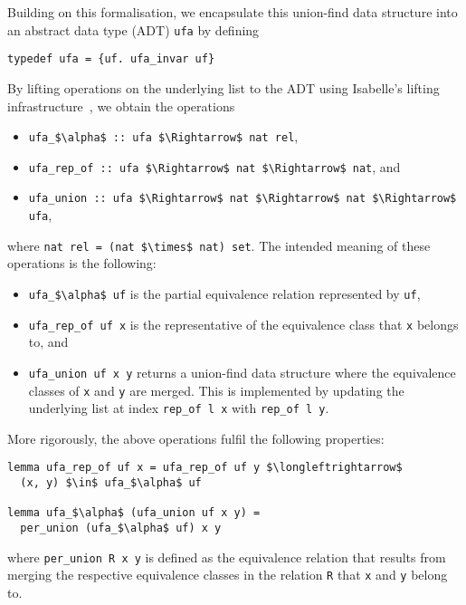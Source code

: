 \documentclass[
  sigplan,
  10pt,
  anonymous,
  review,
  ]{acmart}
\begin{document}
Building on this formalisation, we encapsulate this union-find data structure into an abstract data type (ADT) \lstinline|ufa| by defining
\begin{lstlisting}
typedef ufa = {uf. ufa_invar uf}
\end{lstlisting}
By lifting operations on the underlying list to the ADT using Isabelle's lifting infrastructure~\cite{lifting_transfer}, we obtain the operations
\begin{itemize}
  \item \lstinline!ufa_$\alpha$ :: ufa $\Rightarrow$ nat rel!,
  \item \lstinline!ufa_rep_of :: ufa $\Rightarrow$ nat $\Rightarrow$ nat!, and
  \item \lstinline!ufa_union :: ufa $\Rightarrow$ nat $\Rightarrow$ nat $\Rightarrow$ ufa!,
\end{itemize}
where \lstinline!nat rel = (nat $\times$ nat) set!.
The intended meaning of these operations is the following:
\begin{itemize}
  \item \lstinline!ufa_$\alpha$ uf! is the partial equivalence relation represented by \lstinline!uf!,
  \item \lstinline!ufa_rep_of uf x! is the representative of the equivalence class that \lstinline!x! belongs to, and
  \item \lstinline!ufa_union uf x y! returns a union-find data structure where the equivalence classes of \lstinline!x! and \lstinline!y! are merged.
    This is implemented by updating the underlying list at index \lstinline!rep_of l x! with \lstinline|rep_of l y|.
\end{itemize}
More rigorously, the above operations fulfil the following properties:
\begin{lstlisting}
lemma ufa_rep_of uf x = ufa_rep_of uf y $\longleftrightarrow$
  (x, y) $\in$ ufa_$\alpha$ uf

lemma ufa_$\alpha$ (ufa_union uf x y) =
  per_union (ufa_$\alpha$ uf) x y
\end{lstlisting}
where \lstinline!per_union R x y! is defined as the equivalence relation that results from merging the respective equivalence classes in the relation \lstinline|R| that \lstinline!x! and \lstinline!y! belong to.
\end{document}
